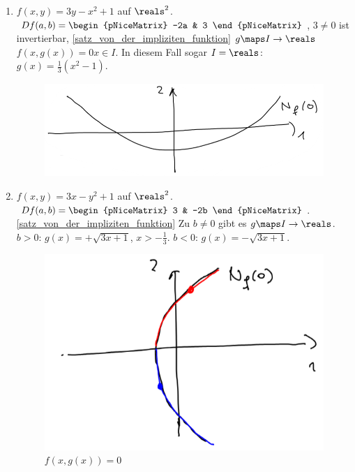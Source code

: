 \begin{beispiele*}
  \begin{enumerate}
    \item \( f(x,y)=3y-x^2+1 \) auf \( \reals^2 \). \( Df(a,b)=\begin{pNiceMatrix} -2a & 3 \end{pNiceMatrix} \), \( 3\neq 0 \) ist invertierbar, \ref{satz_von_der_impliziten_funktion} \timplies \texists  \( g\maps I\to \reals \) \sd \( f(x,g(x))=0 \)\tforall \( x\in I \). In diesem Fall sogar \( I=\reals \): \( g(x)=\frac{1}{3}(x^2-1) \).
    \begin{figure}[H]
      \centering
      \includegraphics[width=0.5\linewidth]{figures/implizite_funktion_beispiel_kein_eingeschraenkter_definitionsbereich}
      \label{fig:implizite_funktion_beispiel_kein_eingeschraenkter_definitionsbereich}
    \end{figure}
    \item \( f(x,y)=3x-y^2+1 \) auf \( \reals^2 \). \( Df(a,b)=\begin{pNiceMatrix} 3 & -2b \end{pNiceMatrix} \). \ref{satz_von_der_impliziten_funktion} \timplies Zu \( b\neq 0 \) gibt es \( g\maps I\to \reals \). \( b>0 \): \( g(x)=+\sqrt{3x+1} \), \( x>-\frac{1}{3} \). \( b<0 \): \( g(x)=-\sqrt{3x+1} \).
    \begin{figure}[H]
      \centering
      \includegraphics[width=0.5\linewidth]{figures/implizite_funktion_beispiel_eingeschraenkter_definitionsbereich}
      \caption*{\( f(x,g(x))=0 \)}
      \label{fig:implizite_funktion_beispiel_eingeschraenkter_definitionsbereich}
    \end{figure}
  \end{enumerate}
\end{beispiele*}
